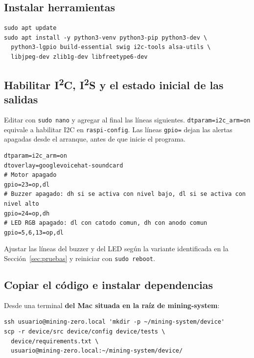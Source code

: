 \documentclass[11pt,a4paper]{article}
\begin{document}
\subsection{Instalar herramientas}

\begin{lstlisting}
sudo apt update
sudo apt install -y python3-venv python3-pip python3-dev \
  python3-lgpio build-essential swig i2c-tools alsa-utils \
  libjpeg-dev zlib1g-dev libfreetype6-dev
\end{lstlisting}

\subsection{Habilitar \texorpdfstring{I\textsuperscript{2}C}{I2C}, \texorpdfstring{I\textsuperscript{2}S}{I2S} y el estado inicial de las salidas}
\label{sec:configtxt}

Editar  con \texttt{sudo nano} y agregar al
final las líneas siguientes. \texttt{dtparam=i2c\_arm=on} equivale a habilitar
I2C en \texttt{raspi-config}.\cite{rpi-config} Las líneas \texttt{gpio=} dejan
las alertas apagadas desde el arranque, antes de que inicie el programa.

\begin{lstlisting}
dtparam=i2c_arm=on
dtoverlay=googlevoicehat-soundcard
# Motor apagado
gpio=23=op,dl
# Buzzer apagado: dh si se activa con nivel bajo, dl si se activa con nivel alto
gpio=24=op,dh
# LED RGB apagado: dl con catodo comun, dh con anodo comun
gpio=5,6,13=op,dl
\end{lstlisting}

Ajustar las líneas del buzzer y del LED según la variante identificada en la
Sección~\ref{sec:pruebas} y reiniciar con \texttt{sudo reboot}.

\subsection{Copiar el código e instalar dependencias}

Desde una terminal \textbf{del Mac situada en la raíz de mining-system}:

\begin{lstlisting}
ssh usuario@mining-zero.local 'mkdir -p ~/mining-system/device'
scp -r device/src device/config device/tests \
  device/requirements.txt \
  usuario@mining-zero.local:~/mining-system/device/
\end{lstlisting}
\end{document}
